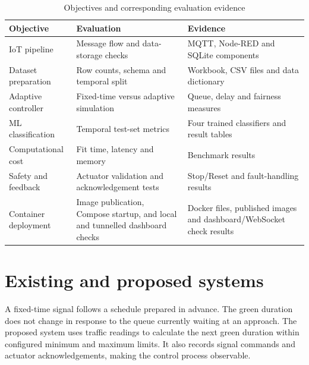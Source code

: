 \documentclass[12pt,a4paper,oneside]{report}
\begin{document}
\begin{table}[htbp]\centering\small
\caption{Objectives and corresponding evaluation evidence}\label{tab:objective-map}
\begin{tabular}{|p{}|p{}|p{}|}\hline
\textbf{Objective} & \textbf{Evaluation} & \textbf{Evidence} \\\hline
IoT pipeline & Message flow and data-storage checks & MQTT, Node-RED and SQLite components \\\hline
Dataset preparation & Row counts, schema and temporal split & Workbook, CSV files and data dictionary \\\hline
Adaptive controller & Fixed-time versus adaptive simulation & Queue, delay and fairness measures \\\hline
ML classification & Temporal test-set metrics & Four trained classifiers and result tables \\\hline
Computational cost & Fit time, latency and memory & Benchmark results \\\hline
Safety and feedback & Actuator validation and acknowledgement tests & Stop/Reset and fault-handling results \\\hline
Container deployment & Image publication, Compose startup, and local and tunnelled dashboard checks & Docker files, published images and dashboard/WebSocket check results \\\hline
\end{tabular}\end{table}

\section{Existing and proposed systems}
A fixed-time signal follows a schedule prepared in advance. The green duration does not change in response to the queue currently waiting at an approach. The proposed system uses traffic readings to calculate the next green duration within configured minimum and maximum limits. It also records signal commands and actuator acknowledgements, making the control process observable.
\end{document}

